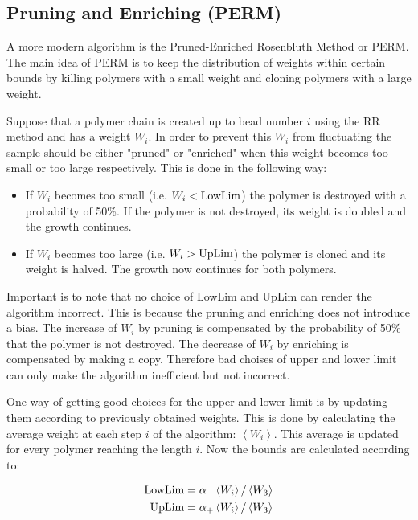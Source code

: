 \subsection*{Pruning and Enriching (PERM)}
A more modern algorithm is the Pruned-Enriched Rosenbluth Method or PERM. The main idea of PERM is to keep the distribution of weights within certain bounds by killing polymers with a small weight and cloning polymers with a large weight.

Suppose that a polymer chain is created up to bead number $i$ using the RR method and has a weight $W_i$. In order to prevent this $W_i$ from fluctuating the sample should be either "pruned" or "enriched" when this weight becomes too small or too large respectively. This is done in the following way:

\begin{itemize}
  \item If $W_i$ becomes too small (i.e. $W_i < \textup{LowLim}$) the polymer is destroyed with a probability of 50\%. If the polymer is not destroyed, its weight is doubled and the growth continues.
  \item If $W_i$ becomes too large (i.e. $W_i > \textup{UpLim}$) the polymer is cloned and its weight is halved. The growth now continues for both polymers.
\end{itemize}

Important is to note that no choice of LowLim and UpLim can render the algorithm incorrect. This is because the pruning and enriching does not introduce a bias. The increase of $W_i$ by pruning is compensated by the probability of 50\% that the polymer is not destroyed. The decrease of $W_i$ by enriching is compensated by making a copy. Therefore bad choises of upper and lower limit can only make the algorithm inefficient but not incorrect.

One way of getting good choices for the upper and lower limit is by updating them according to previously obtained weights. This is done by calculating the average weight at each step $i$ of the algorithm: $\left \langle W_i \right \rangle$. This average is updated for every polymer reaching the length $i$. Now the bounds are calculated according to:

\begin{align} \label{eq:LowLim_UpLim}
	\textup{LowLim} &= \alpha_- \left \langle W_i \right \rangle / \left \langle W_3 \right \rangle \\
	\textup{UpLim} &= \alpha_+ \left \langle W_i \right \rangle / \left \langle W_3 \right \rangle
\end{align}

